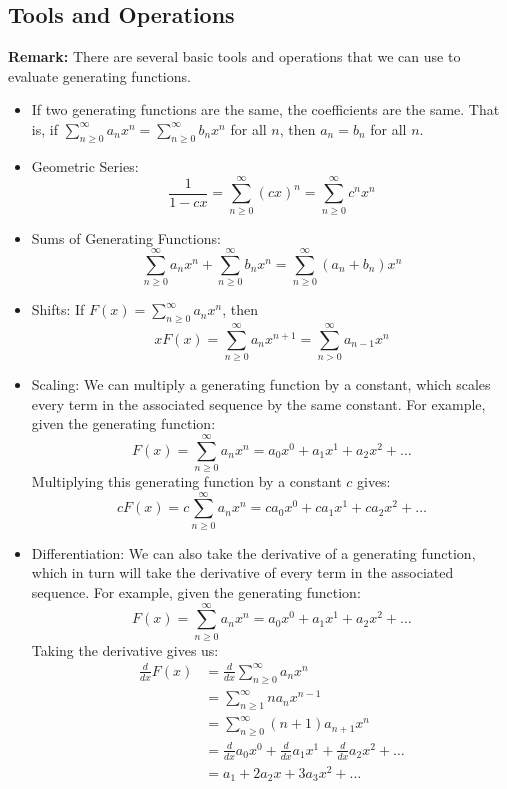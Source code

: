 \documentclass[letterpaper]{article}
\begin{document}
\subsection{Tools and Operations}
\textbf{Remark:} There are several basic tools and operations that we can use to evaluate generating functions.
\begin{itemize}
    \item If two generating functions are the same, the coefficients are the same. That is, if $\sum_{n \geq 0}^{\infty} a_n x^n = \sum_{n \geq 0}^{\infty} b_n x^n$ for all $n$, then $a_n = b_n$ for all $n$. 
    
    \item Geometric Series:
    \[\frac{1}{1 - cx} = \sum_{n \geq 0}^{\infty} (cx)^n = \sum_{n \geq 0}^{\infty} c^n x^n\]

    \item Sums of Generating Functions: 
    \[\sum_{n \geq 0}^{\infty} a_n x^n + \sum_{n \geq 0}^{\infty} b_n x^n = \sum_{n \geq 0}^{\infty} (a_n + b_n) x^n\]

    \item Shifts: If $F(x) = \sum_{n \geq 0}^{\infty} a_n x^n$, then
    \[xF(x) = \sum_{n \geq 0}^{\infty} a_n x^{n + 1} = \sum_{n > 0}^{\infty} a_{n - 1} x^n\]

    \item Scaling: We can multiply a generating function by a constant, which scales every term in the associated sequence by the same constant. For example, given the generating function:
    \[F(x) = \sum_{n \geq 0}^{\infty} a_n x^n = a_0 x^0 + a_1 x^1 + a_2 x^2 + \dots\]
    Multiplying this generating function by a constant $c$ gives:
    \[cF(x) = c\sum_{n \geq 0}^{\infty} a_n x^n = ca_0 x^0 + ca_1 x^1 + ca_2 x^2 + \dots\]
    
    \item Differentiation: We can also take the derivative of a generating function, which in turn will take the derivative of every term in the associated sequence. For example, given the generating function:
    \[F(x) = \sum_{n \geq 0}^{\infty} a_n x^n = a_0 x^0 + a_1 x^1 + a_2 x^2 + \dots\]
    Taking the derivative gives us:
    \begin{equation*}
        \begin{aligned}
            \frac{d}{dx} F(x) &= \frac{d}{dx} \sum_{n \geq 0}^{\infty} a_n x^n \\ 
                &= \sum_{n \geq 1}^{\infty} n a_n x^{n - 1} \\
                &= \sum_{n \geq 0}^{\infty} (n + 1)a_{n + 1}x^n \\
                &= \frac{d}{dx} a_0 x^0 + \frac{d}{dx} a_1 x^1 + \frac{d}{dx} a_2 x^2 + \dots \\
                &= a_1 + 2a_2 x + 3a_3 x^2 + \dots
        \end{aligned}
    \end{equation*}
\end{itemize}
\end{document}
